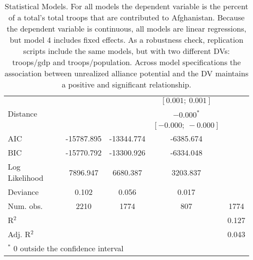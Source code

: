 \begin{table}[H]
\begin{center}
\begin{tabular}{l c c c c }
               &                   &                     & $[0.001;\ 0.001]$   &                    \\
Distance       &                   &                     & $-0.000^{*}$        &                    \\
               &                   &                     & $[-0.000;\ -0.000]$ &                    \\
\hline
AIC            & -15787.895        & -13344.774          & -6385.674           &                    \\
BIC            & -15770.792        & -13300.926          & -6334.048           &                    \\
Log Likelihood & 7896.947          & 6680.387            & 3203.837            &                    \\
Deviance       & 0.102             & 0.056               & 0.017               &                    \\
Num. obs.      & 2210              & 1774                & 807                 & 1774               \\
R$^2$          &                   &                     &                     & 0.127              \\
Adj. R$^2$     &                   &                     &                     & 0.043              \\
\hline
\multicolumn{5}{l}{\scriptsize{$^*$ 0 outside the confidence interval}}
\end{tabular}
\caption{Statistical Models. For all models the dependent variable is the percent of a total's total troops that are contributed to Afghanistan. Because the dependent variable is continuous, all models are linear regressions, but model 4 includes fixed effects. As a robustness check, replication scripts include the same models, but with two different DVs: troops/gdp and troops/population. Across model specifications the association between unrealized alliance potential and the DV maintains a positive and significant relationship.}
\label{table:coefficients}
\end{center}
\end{table}
